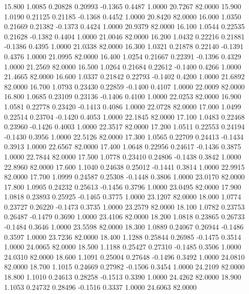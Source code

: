   15.800   1.0085   0.20828   0.20993  -0.1365   0.4487   1.0000  20.7267  82.0000
  15.900   1.0190   0.21125   0.21185  -0.1368   0.4452   1.0000  20.8420  82.0000
  16.000   1.0350   0.21669   0.21382  -0.1373   0.4424   1.0000  20.9379  82.0000
  16.100   1.0544   0.22535   0.21628  -0.1382   0.4404   1.0000  21.0046  82.0000
  16.200   1.0432   0.22216   0.21881  -0.1386   0.4395   1.0000  21.0338  82.0000
  16.300   1.0321   0.21878   0.22140  -0.1391   0.4376   1.0000  21.0995  82.0000
  16.400   1.0254   0.21667   0.22391  -0.1396   0.4329   1.0000  21.2569  82.0000
  16.500   1.0264   0.21684   0.22612  -0.1400   0.4266   1.0000  21.4665  82.0000
  16.600   1.0337   0.21842   0.22793  -0.1402   0.4200   1.0000  21.6892  82.0000
  16.700   1.0793   0.23430   0.22859  -0.1400   0.4107   1.0000  22.0009  82.0000
  16.800   1.0685   0.23109   0.23136  -0.1406   0.4100   1.0000  22.0253  82.0000
  16.900   1.0581   0.22778   0.23420  -0.1413   0.4086   1.0000  22.0728  82.0000
  17.000   1.0499   0.22514   0.23704  -0.1420   0.4053   1.0000  22.1845  82.0000
  17.100   1.0483   0.22468   0.23960  -0.1426   0.4003   1.0000  22.3517  82.0000
  17.200   1.0511   0.22553   0.24194  -0.1430   0.3956   1.0000  22.5126  82.0000
  17.300   1.0565   0.22709   0.24413  -0.1434   0.3913   1.0000  22.6567  82.0000
  17.400   1.0648   0.22956   0.24617  -0.1436   0.3875   1.0000  22.7844  82.0000
  17.500   1.0778   0.23410   0.24806  -0.1438   0.3842   1.0000  22.8960  82.0000
  17.600   1.1040   0.24638   0.25012  -0.1441   0.3814   1.0000  22.9915  82.0000
  17.700   1.0999   0.24587   0.25308  -0.1448   0.3806   1.0000  23.0170  82.0000
  17.800   1.0905   0.24232   0.25613  -0.1456   0.3796   1.0000  23.0495  82.0000
  17.900   1.0818   0.23893   0.25925  -0.1465   0.3775   1.0000  23.1207  82.0000
  18.000   1.0774   0.23727   0.26220  -0.1473   0.3735   1.0000  23.2579  82.0000
  18.100   1.0782   0.23753   0.26487  -0.1479   0.3690   1.0000  23.4106  82.0000
  18.200   1.0818   0.23865   0.26733  -0.1484   0.3646   1.0000  23.5598  82.0000
  18.300   1.0889   0.24067   0.26944  -0.1486   0.3597   1.0000  23.7236  82.0000
  18.400   1.1288   0.25844   0.26985  -0.1475   0.3514   1.0000  24.0065  82.0000
  18.500   1.1188   0.25427   0.27310  -0.1485   0.3506   1.0000  24.0310  82.0000
  18.600   1.1091   0.25004   0.27648  -0.1496   0.3492   1.0000  24.0810  82.0000
  18.700   1.1015   0.24669   0.27982  -0.1506   0.3454   1.0000  24.2109  82.0000
  18.800   1.1010   0.24613   0.28258  -0.1513   0.3390   1.0000  24.4262  82.0000
  18.900   1.1053   0.24732   0.28496  -0.1516   0.3337   1.0000  24.6063  82.0000
